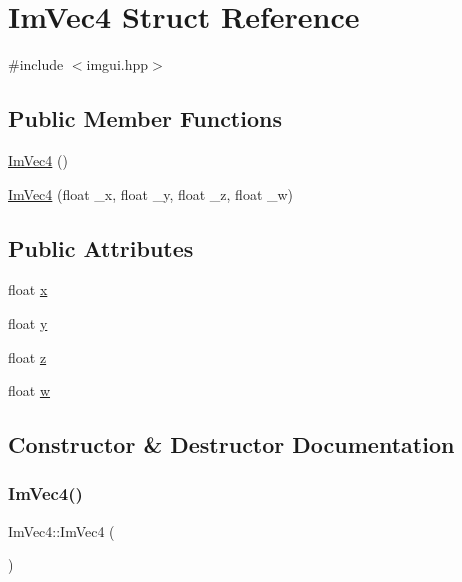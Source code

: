 \hypertarget{struct_im_vec4}{}\section{Im\+Vec4 Struct Reference}
\label{struct_im_vec4}


{\ttfamily \#include $<$imgui.\+hpp$>$}

\subsection*{Public Member Functions}
\begin{DoxyCompactItemize}
\item 
\hyperlink{struct_im_vec4_a6fba9919c960ca7eda33969d700d2a86}{Im\+Vec4} ()
\item 
\hyperlink{struct_im_vec4_af9e535f36b0fc7b9af0f60951fb4ffe4}{Im\+Vec4} (float \+\_\+x, float \+\_\+y, float \+\_\+z, float \+\_\+w)
\end{DoxyCompactItemize}
\subsection*{Public Attributes}
\begin{DoxyCompactItemize}
\item 
float \hyperlink{struct_im_vec4_a2090f651f5e5b78fedae8dab87343db6}{x}
\item 
float \hyperlink{struct_im_vec4_a6b4d00ae261be4fe54353c759c561fe7}{y}
\item 
float \hyperlink{struct_im_vec4_aba6a75356917a28c967954bb29133a1a}{z}
\item 
float \hyperlink{struct_im_vec4_afeed5acd9f0d2043175f4da229d12a38}{w}
\end{DoxyCompactItemize}


\subsection{Constructor \& Destructor Documentation}
\hypertarget{struct_im_vec4_a6fba9919c960ca7eda33969d700d2a86}{}\label{struct_im_vec4_a6fba9919c960ca7eda33969d700d2a86} 
\subsubsection{\texorpdfstring{Im\+Vec4()}{ImVec4()}\hspace{0.1cm}{\footnotesize\ttfamily [1/2]}}
{\footnotesize\ttfamily Im\+Vec4\+::\+Im\+Vec4 (\begin{DoxyParamCaption}{ }\end{DoxyParamCaption})}

